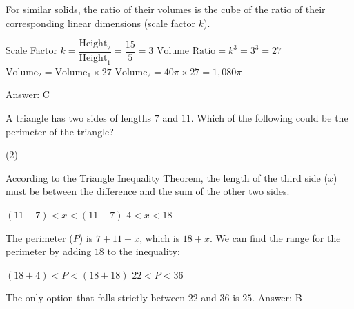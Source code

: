 \documentclass[11pt,paper=a4,answers]{exam}
\begin{document}
\begin{questions}
\begin{solution}
For similar solids, the ratio of their volumes is the cube of the ratio of their corresponding linear dimensions (scale factor $k$).
\vspace{5pt}
\begin{center}
Scale Factor $k = \dfrac{\text{Height}_2}{\text{Height}_1} = \dfrac{15}{5} = 3$
\vspace{5pt}
$\text{Volume Ratio} = k^3 = 3^3 = 27$
\vspace{5pt}
$\text{Volume}_2 = \text{Volume}_1 \times 27$
\vspace{5pt}
$\text{Volume}_2 = 40\pi \times 27 = 1,080\pi$
\end{center}
\vspace{5pt}
Answer: \colorbox{yellow!100}{C}
\end{solution}

\vspace{1cm}

\question
A triangle has two sides of lengths $7$ and $11$. Which of the following could be the perimeter of the triangle?
\begin{tasks}(2)
\end{tasks}

\begin{solution}
According to the Triangle Inequality Theorem, the length of the third side ($x$) must be between the difference and the sum of the other two sides.
\vspace{5pt}
\begin{center}
$(11 - 7) < x < (11 + 7)$
\vspace{5pt}
$4 < x < 18$
\end{center}
\vspace{5pt}
The perimeter ($P$) is $7 + 11 + x$, which is $18 + x$. We can find the range for the perimeter by adding $18$ to the inequality:
\vspace{5pt}
\begin{center}
$(18 + 4) < P < (18 + 18)$
\vspace{5pt}
$22 < P < 36$
\end{center}
\vspace{5pt}
The only option that falls strictly between $22$ and $36$ is $25$.
\vspace{5pt}
Answer: \colorbox{yellow!100}{B}
\end{solution}

\vspace{1cm}


\end{questions}
\end{document}
